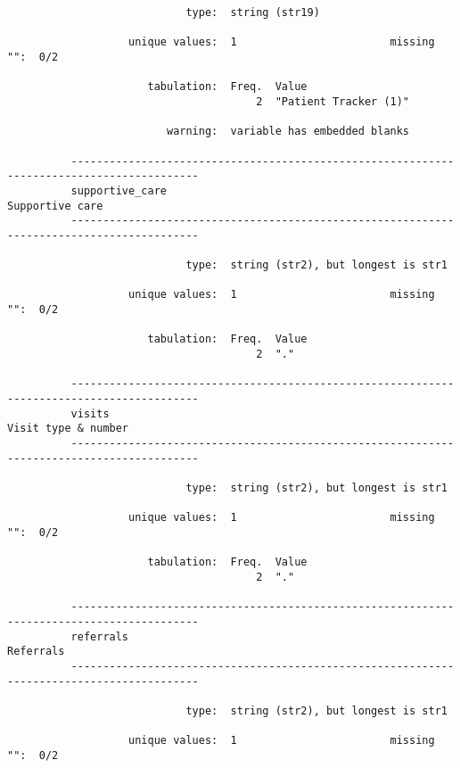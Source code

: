 \documentclass{article}
\begin{document}
\begin{verbatim}
                            type:  string (str19)
          
                   unique values:  1                        missing "":  0/2
          
                      tabulation:  Freq.  Value
                                       2  "Patient Tracker (1)"
          
                         warning:  variable has embedded blanks
          
          ------------------------------------------------------------------------------------------
          supportive_care                                                            Supportive care
          ------------------------------------------------------------------------------------------
          
                            type:  string (str2), but longest is str1
          
                   unique values:  1                        missing "":  0/2
          
                      tabulation:  Freq.  Value
                                       2  "."
          
          ------------------------------------------------------------------------------------------
          visits                                                                 Visit type & number
          ------------------------------------------------------------------------------------------
          
                            type:  string (str2), but longest is str1
          
                   unique values:  1                        missing "":  0/2
          
                      tabulation:  Freq.  Value
                                       2  "."
          
          ------------------------------------------------------------------------------------------
          referrals                                                                        Referrals
          ------------------------------------------------------------------------------------------
          
                            type:  string (str2), but longest is str1
          
                   unique values:  1                        missing "":  0/2
          

\end{verbatim}
\end{document}
